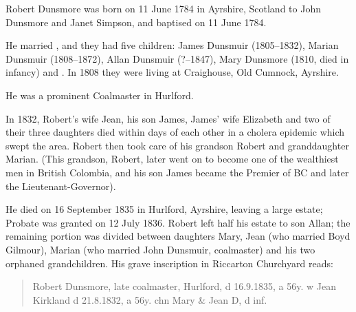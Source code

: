 
Robert Dunsmore was born on 11 June 1784 in Ayrshire, Scotland to John Dunsmore and Janet Simpson, and baptised on 11 June 1784.  

He married , and they had five children: James Dunsmuir (1805--1832), Marian Dunsmuir (1808--1872), 
Allan Dunsmuir (?--1847), Mary Dunsmore (1810, died in infancy) and .
In 1808 they were living at Craighouse, Old Cumnock, Ayrshire. \cite{RDunsmore1808}

He was a prominent Coalmaster in Hurlford.

In 1832, Robert's wife Jean, his son James, James' wife Elizabeth and two of their three daughters died within days of each other in a cholera epidemic which swept the area. Robert then took care of his grandson Robert and granddaughter Marian. (This grandson, Robert, later went on to become one of the wealthiest men in British Colombia, and his son James became the Premier of BC and later the Lieutenant-Governor). 

He died on 16 September 1835 in Hurlford, Ayrshire, leaving a large estate; Probate was granted on 12 July 1836.\cite{RDunsmoreWill} Robert left half his estate to son Allan; the remaining portion was divided between daughters Mary, Jean (who married Boyd Gilmour), Marian (who married John Dunsmuir, coalmaster) and his two orphaned grandchildren.  His grave inscription in Riccarton Churchyard reads:

\begin{quotation}
Robert Dunsmore, late coalmaster, Hurlford, d 16.9.1835, a 56y. w Jean Kirkland d 21.8.1832, a 56y. chn Mary \& Jean D, d inf.
\end{quotation}

